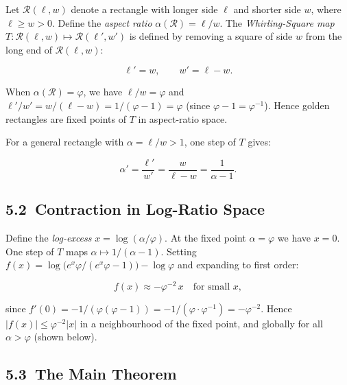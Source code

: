Let $\mathcal{R}(\ell, w)$ denote a rectangle with
longer side $\ell$ and shorter side $w$, where
$\ell \geq w > 0$.  Define the \emph{aspect ratio}
$\alpha(\mathcal{R}) = \ell / w$.  The
\emph{Whirling-Square map}
$T : \mathcal{R}(\ell, w) \mapsto
\mathcal{R}(\ell', w')$
is defined by removing a square of side $w$ from
the long end of $\mathcal{R}(\ell, w)$:

\[\ell' = w, \qquad w' = \ell - w.\]

When $\alpha(\mathcal{R}) = \varphi$, we have
$\ell/w = \varphi$ and
$\ell' / w' = w / (\ell - w)
= 1 / (\varphi - 1) = \varphi$ (since
$\varphi - 1 = \varphi^{-1}$).
Hence golden rectangles are fixed points of $T$
in aspect-ratio space.

For a general rectangle with
$\alpha = \ell / w > 1$, one step of $T$ gives:

\[\alpha' = \frac{\ell'}{ w'} = \frac{w}{\ell - w}
  = \frac{1}{\alpha - 1}.\]

\subsection{5.2\ Contraction in Log-Ratio
  Space}\label{subsec:ch30-logspace}

Define the \emph{log-excess}
$x = \log(\alpha / \varphi)$.  At the fixed point
$\alpha = \varphi$ we have $x = 0$.  One step of
$T$ maps $\alpha \mapsto 1/(\alpha - 1)$.
Setting $f(x) = \log\!\bigl(e^x\varphi /
(e^x\varphi - 1)\bigr) - \log\varphi$ and
expanding to first order:

\[f(x) \approx -\varphi^{-2}\,x
  \quad \text{for small } x,\]

since $f'(0) = -1/(\varphi(\varphi-1))
= -1/(\varphi \cdot \varphi^{-1})
= -\varphi^{-2}$.
Hence $|f(x)| \leq \varphi^{-2}|x|$ in a
neighbourhood of the fixed point, and globally
for all $\alpha > \varphi$ (shown below).

\subsection{5.3\ The Main Theorem}
\label{subsec:ch30-main-thm}

